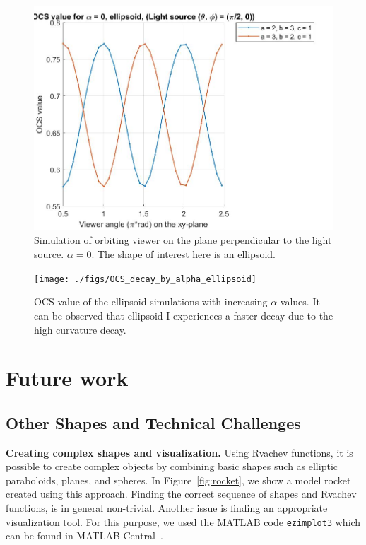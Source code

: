 \documentclass[11pt]{amsart}
\theoremstyle{definition}
\begin{document}
\begin{figure}[h]
\includegraphics[scale=0.2]{./figs/OCS_perpendicular_plane_ellipsoid}
\caption{Simulation of orbiting viewer on the plane perpendicular to the light source. $\alpha = 0$. The shape of interest here is an ellipsoid.}
\label{OCSPerpendicularPlaneEllipsoid}
\end{figure}

\begin{figure}[h]
\texttt{[image: ./figs/OCS\_decay\_by\_alpha\_ellipsoid]}
\caption{OCS value of the ellipsoid simulations with increasing $\alpha$ values. It can be observed that ellipsoid I experiences a faster decay due to the high curvature decay.}
\label{OCSDecaybyAlphaEllipsoid}
\end{figure}

\section{Future work}
\subsection{Other Shapes and Technical Challenges}

\textbf{Creating complex shapes and visualization.}
Using Rvachev functions, it is possible to create 
complex objects by combining basic shapes such as elliptic paraboloids, 
planes, and spheres. In Figure~\ref{fig:rocket}, we show a model rocket created
using this approach. Finding the correct sequence of shapes and Rvachev
functions, is in general non-trivial. Another issue is finding 
an appropriate visualization tool. For this purpose, 
we used the MATLAB code \verb+ezimplot3+ which can be 
found in MATLAB Central~\cite{Morales}.
\end{document}

